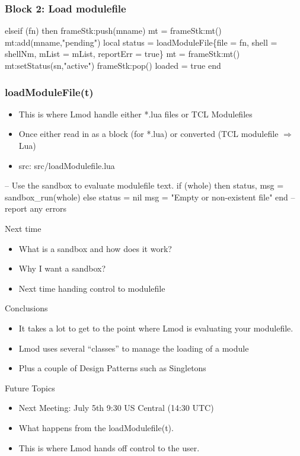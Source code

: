 \documentclass{beamer}
\begin{document}
\begin{frame}[fragile]
    \frametitle{Block 2: Load modulefile}
 {\tiny
    \begin{semiverbatim}
elseif (fn) then
   frameStk:push(mname)
   mt = frameStk:mt()
   mt:add(mname,"pending")
   local status = loadModuleFile\{file = fn, shell = shellNm,
                   mList = mList, reportErr = true\}
   mt = frameStk:mt()
   mt:setStatus(sn,"active")                   
   frameStk:pop()
   loaded = true
end
    \end{semiverbatim}
}
\end{frame}

\begin{frame}[fragile]
    \frametitle{loadModuleFile(t)}
  \begin{itemize}
    \item This is where Lmod handle either *.lua files or TCL Modulefiles
    \item Once either read in as a block (for *.lua) or converted (TCL
      modulefile $\Rightarrow$ Lua)
    \item src: src/loadModulefile.lua
  \end{itemize}
 {\tiny
    \begin{semiverbatim}
   -- Use the sandbox to evaluate modulefile text.
   if (whole) then
      status, msg = sandbox_run(whole)
   else
      status = nil
      msg    = "Empty or non-existent file"
   end
   -- report any errors
    \end{semiverbatim}
}

\end{frame}

\begin{frame}{Next time}
  \begin{itemize}
    \item What is a sandbox and how does it work?
    \item Why I want a sandbox?
    \item Next time handing control to modulefile
  \end{itemize}
\end{frame}



\begin{frame}{Conclusions}
  \begin{itemize}
    \item It takes a lot to get to the point where Lmod is evaluating
      your modulefile.
    \item Lmod uses several ``classes'' to manage the loading of a
      module
    \item Plus a couple of Design Patterns such as Singletons  
  \end{itemize}
\end{frame}

\begin{frame}{Future Topics}
  \begin{itemize}
    \item Next Meeting: July 5th 9:30 US Central (14:30 UTC)
    \item What happens from the loadModulefile(t).
    \item This is where Lmod hands off control to the user.
  \end{itemize}
\end{frame}
\end{document}
